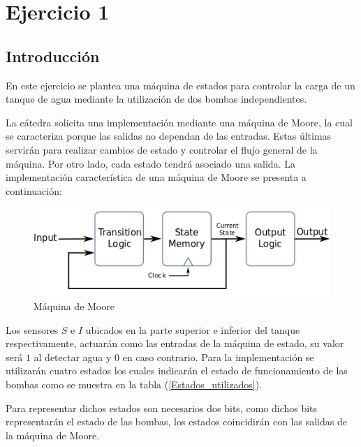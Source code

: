 \section{Ejercicio 1}

\subsection{Introducción}

En este ejercicio se plantea una máquina de estados para controlar la carga de un tanque de agua mediante la utilización de dos bombas independientes. \par
La cátedra solicita una implementación mediante una máquina de Moore, la cual se caracteriza porque las salidas no dependan de las entradas. Estas últimas servirán para realizar cambios de estado y controlar el flujo general de la máquina. Por otro lado, cada estado tendrá asociado una salida. La implementación característica de una máquina de Moore se presenta a continuación:

\begin{figure}[H]
\begin{center}
\includegraphics[scale=0.8]{Ejercicio1/Imagenes/moore}
\caption{Máquina de Moore}
\end{center}
\label{Maquina_de_Moore}
\end{figure}

Los sensores $S$ e $I$ ubicados en la parte superior e inferior del tanque respectivamente, actuarán como las entradas de la máquina de estado, su valor será $1$ al detectar agua y $0$ en caso contrario. Para la implementación se utilizarán cuatro estados los cuales indicarán el estado de funcionamiento de las bombas como se muestra en la tabla (\ref{Estados_utilizados}). \par
Para representar dichos estados son necesarios dos bits, como dichos bits representarán el estado de las bombas, los estados coincidirán con las salidas de la máquina de Moore.
 

\begin{table}[H]
	\begin{center}
	\caption{Estados utilizados}
	\label{Estados_utilizados}
	\end{center}

\end{table}


